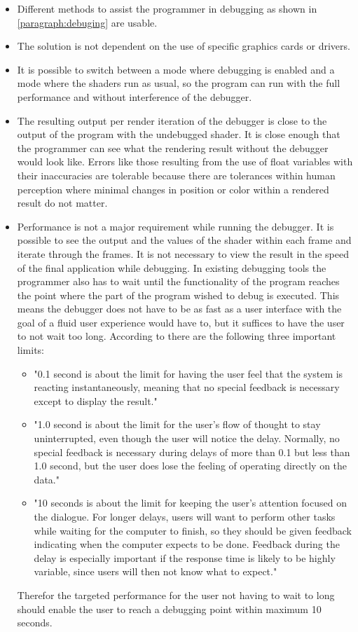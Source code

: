\begin{itemize}
	\item Different methods to assist the programmer in debugging as shown in \autoref{paragraph:debuging} are usable.
	\item The solution is not dependent on the use of specific graphics cards or drivers.
	\item It is possible to switch between a mode where debugging is enabled and a mode where the shaders run as usual, so the program can run with the full performance and without interference of the debugger.
	\item The resulting output per render iteration of the debugger is close to the output of the program with the undebugged shader. It is close enough that the programmer can see what the rendering result without the debugger would look like. Errors like those resulting from the use of float variables with their inaccuracies are tolerable because there are tolerances within human perception where minimal changes in position or color within a rendered result do not matter.
	\item Performance is not a major requirement while running the debugger. It is possible to see the output and the values of the shader within each frame and iterate through the frames. It is not necessary to view the result in the speed of the final application while debugging. In existing debugging tools the programmer also has to wait until the functionality of the program reaches the point where the part of the program wished to debug is executed. This means the debugger does not have to be as fast as a user interface with the goal of a fluid user experience would have to, but it suffices to have the user to not wait too long. According to  there are the following three important limits:
	\begin{itemize}
	\item "0.1 second is about the limit for having the user feel that the system is reacting instantaneously, meaning that no special feedback is necessary except to display the result."
	\item "1.0 second is about the limit for the user's flow of thought to stay uninterrupted, even though the user will notice the delay. Normally, no special feedback is necessary during delays of more than 0.1 but less than 1.0 second, but the user does lose the feeling of operating directly on the data."
    \item "10 seconds is about the limit for keeping the user's attention focused on the dialogue. For longer delays, users will want to perform other tasks while waiting for the computer to finish, so they should be given feedback indicating when the computer expects to be done. Feedback during the delay is especially important if the response time is likely to be highly variable, since users will then not know what to expect."
	\end{itemize}
	Therefor the targeted performance for the user not having to wait to long should enable the user to reach a debugging point within maximum 10 seconds.
\end{itemize}




